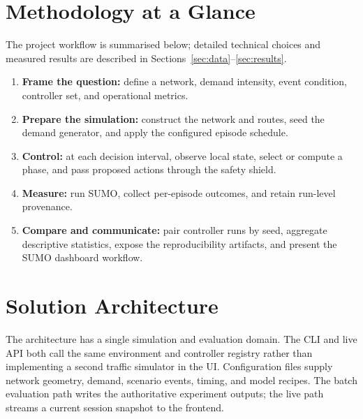 \documentclass[11pt,a4paper]{article}
\begin{document}
\section{Methodology at a Glance}
The project workflow is summarised below; detailed technical choices and measured
results are described in Sections~\ref{sec:data}--\ref{sec:results}.
\begin{enumerate}
  \item \textbf{Frame the question:} define a network, demand intensity, event condition,
  controller set, and operational metrics.
  \item \textbf{Prepare the simulation:} construct the network and routes, seed the
  demand generator, and apply the configured episode schedule.
  \item \textbf{Control:} at each decision interval, observe local state, select or
  compute a phase, and pass proposed actions through the safety shield.
  \item \textbf{Measure:} run SUMO, collect per-episode outcomes, and retain run-level
  provenance.
  \item \textbf{Compare and communicate:} pair controller runs by seed, aggregate
  descriptive statistics, expose the reproducibility artifacts, and present the SUMO
  dashboard workflow.
\end{enumerate}

\section{Solution Architecture}
\label{sec:architecture}
The architecture has a single simulation and evaluation domain. The CLI and live API
both call the same environment and controller registry rather than implementing a
second traffic simulator in the UI. Configuration files supply network geometry,
demand, scenario events, timing, and model recipes. The batch evaluation path writes
the authoritative experiment outputs; the live path streams a current session snapshot
to the frontend.
\end{document}
